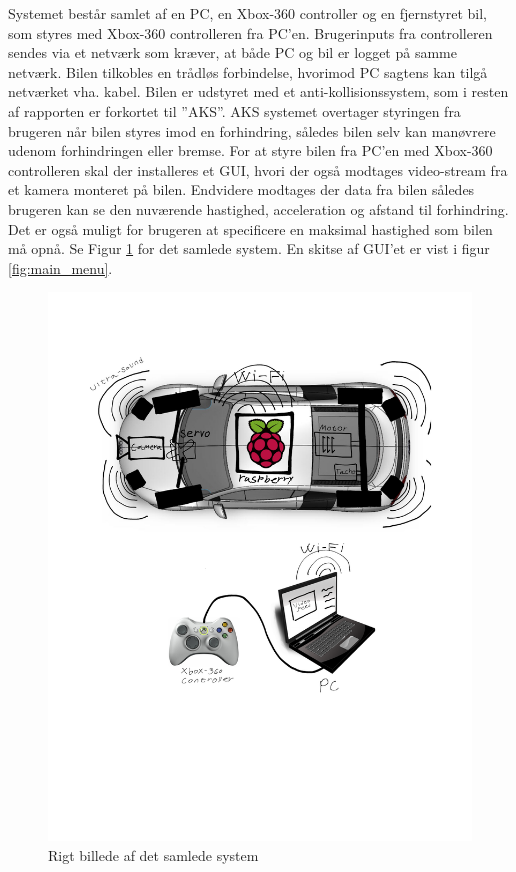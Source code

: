 Systemet består samlet af en PC, en Xbox-360 controller og en fjernstyret bil, som styres med Xbox-360 controlleren fra PC'en. Brugerinputs fra controlleren sendes via et netværk som kræver, at både PC og bil er logget på samme netværk. Bilen tilkobles en trådløs forbindelse, hvorimod PC sagtens kan tilgå netværket vha. kabel. Bilen er udstyret med et anti-kollisionssystem, som i resten af rapporten er forkortet til ''AKS''. AKS systemet overtager styringen fra brugeren når bilen styres imod en forhindring, således bilen selv kan manøvrere udenom forhindringen eller bremse. For at styre bilen fra PC'en med Xbox-360 controlleren skal der installeres et GUI, hvori der også modtages video-stream fra et kamera monteret på bilen. Endvidere modtages der data fra bilen således brugeren kan se den nuværende hastighed, acceleration og afstand til forhindring. Det er også muligt for brugeren at specificere en maksimal hastighed som bilen må opnå. Se Figur \ref{fig:rigbillede} for det samlede system. En skitse af GUI'et er vist i figur \ref{fig:main_menu}.
\begin{figure}[H]
\centering
\includegraphics[width=\textwidth - 7.38 cm]{../fig/billeder/rigbillede}
\caption{Rigt billede af det samlede system}
\label{fig:rigbillede}
\end{figure} 
